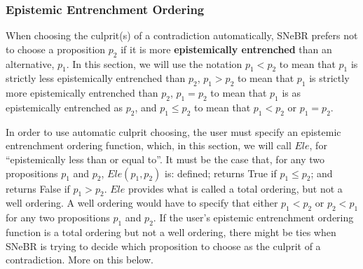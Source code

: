 \documentclass{book}
\begin{document}
\subsubsection{Epistemic Entrenchment Ordering}\label{sec:epistemicOrdering}
When choosing the culprit(s) of a contradiction automatically, SNeBR prefers not
to choose a proposition $p_2$ if it is more \textbf{epistemically entrenched}
than an alternative, $p_1$.  In this section, we will use the notation $p_1 <
p_2$ to mean that $p_1$ is strictly less epistemically entrenched than $p_2$,
$p_1 > p_2$ to mean that $p_1$ is strictly more epistemically entrenched than
$p_2$, $p_1 = p_2$ to mean that $p_1$ is as epistemically entrenched as $p_2$,
and $p_1 \leq p_2$ to mean that $p_1 < p_2$ or $p_1 = p_2$.

In order to use automatic culprit choosing, the user must specify an epistemic
entrenchment ordering function, which, in this section, we will call $Ele$, for
``epistemically less than or equal to''.  It must be the case that, for any two
propositions $p_1$ and $p_2$, $Ele(p_1, p_2)$ is: defined; returns True if $p_1
\leq p_2$; and returns False if $p_1 > p_2$.  $Ele$ provides what is called a
total ordering, but not a well ordering.  A well ordering would have to specify
that either $p_1 < p_2$ or $p_2 < p_1$ for any two propositions $p_1$ and
$p_2$.  If the user's epistemic entrenchment ordering function is a total
ordering but not a well ordering, there might be ties when SNeBR is trying to
decide which proposition to choose as the culprit of a contradiction.  More on
this below.
\end{document}
